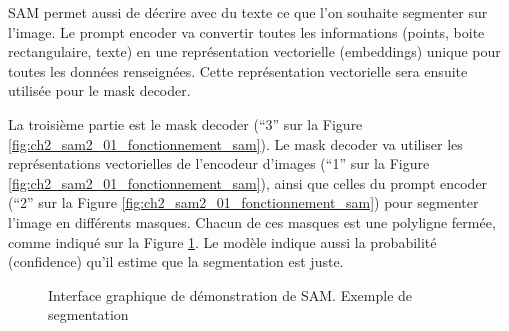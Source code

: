 SAM permet aussi de décrire avec du texte ce que l’on souhaite segmenter sur l’image. Le prompt encoder va convertir toutes les informations (points, boite rectangulaire, texte) en une représentation vectorielle (embeddings) unique pour toutes les données renseignées. Cette représentation vectorielle sera ensuite utilisée pour le mask decoder.

La troisième partie est le mask decoder (``3'' sur la Figure \ref{fig:ch2_sam2_01_fonctionnement_sam}). Le mask decoder va utiliser les représentations vectorielles de l’encodeur d’images (``1'' sur la Figure \ref{fig:ch2_sam2_01_fonctionnement_sam}), ainsi que celles du prompt encoder (``2'' sur la Figure \ref{fig:ch2_sam2_01_fonctionnement_sam}) pour segmenter l’image en différents masques. Chacun de ces masques est une polyligne fermée, comme indiqué sur la Figure \ref{fig:ch2_sam2_05_masques}. Le modèle indique aussi la probabilité (confidence) qu’il estime que la segmentation est juste.

\begin{figure}[H]
    \centering
    \caption{Interface graphique de démonstration de SAM. Exemple de segmentation}
    \label{fig:ch2_sam2_05_masques}
\end{figure}

